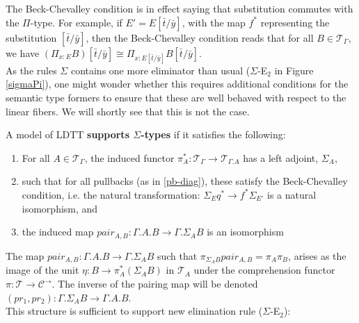 The Beck-Chevalley condition is in effect saying that substitution commutes with the $\Pi$-type. For example, if $E' = E[\bar t/\bar y]$, with the map $f^*$ representing the substitution $[\bar t/\bar y]$, then the Beck-Chevalley condition reads that for all $B \in \mathcal{T}_{\Gamma}$, we have $(\Pi_{x : E}B)[\bar t/\bar y] \cong \Pi_{x : E[\bar t/\bar y]}B[\bar t/\bar y]$.\\
As the rules $\Sigma$ contains one more eliminator than usual ($\Sigma$-E$_2$ in Figure \ref{sigmaPi}), one might wonder whether this requires additional conditions for the semantic type formers to ensure that these are well behaved with respect to the linear fibers. We will shortly see that this is not the case.
\begin{defn}A model of LDTT \textbf{supports $\Sigma$-types} if it satisfies the following:
  \begin{enumerate}
  \item For all $A \in \mathcal{T}_{\Gamma}$, the induced functor $\pi_A^* : \mathcal{T}_{\Gamma} \to \mathcal{T}_{\Gamma.A}$ has a left adjoint, $\Sigma_A$,
  \item such that for all pullbacks (as in \ref{pb-diag}), these satisfy the Beck-Chevalley condition, i.e. the natural transformation: $\Sigma_Eq^* \to f^*\Sigma_{E'}$ is a natural isomorphism, and
  \item the induced map $pair_{A,B} : \Gamma.A.B \to \Gamma.\Sigma_AB$ is an isomorphism
  \end{enumerate}
\end{defn}
The map $pair_{A, B} : \Gamma.A.B \to \Gamma.\Sigma_AB$ such that $\pi_{\Sigma_AB}pair_{A,B} = \pi_A\pi_B$, arises as the image of the unit $\eta : B \to \pi_A^*(\Sigma_AB)$ in $\mathcal{T}_A$ under the comprehension functor $\pi : \mathcal{T} \to \mathcal{C}^{\to}$. The inverse of the pairing map will be denoted $(pr_1, pr_2) : \Gamma.\Sigma_AB \to \Gamma.A.B$.\\
This structure is sufficient to support new elimination rule ($\Sigma$-E$_2$):
